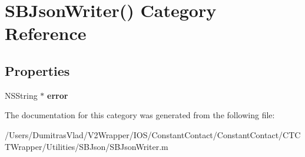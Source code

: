 \hypertarget{category_s_b_json_writer_07_08}{\section{S\-B\-Json\-Writer() Category Reference}
\label{category_s_b_json_writer_07_08}
}
\subsection*{Properties}
\begin{DoxyCompactItemize}
\item 
\hypertarget{category_s_b_json_writer_07_08_abe238aca1b2c70d54e166c0a944d8866}{N\-S\-String $\ast$ {\bfseries error}}\label{category_s_b_json_writer_07_08_abe238aca1b2c70d54e166c0a944d8866}

\end{DoxyCompactItemize}


The documentation for this category was generated from the following file\-:\begin{DoxyCompactItemize}
\item 
/\-Users/\-Dumitras\-Vlad/\-V2\-Wrapper/\-I\-O\-S/\-Constant\-Contact/\-Constant\-Contact/\-C\-T\-C\-T\-Wrapper/\-Utilities/\-S\-B\-Json/S\-B\-Json\-Writer.\-m\end{DoxyCompactItemize}
